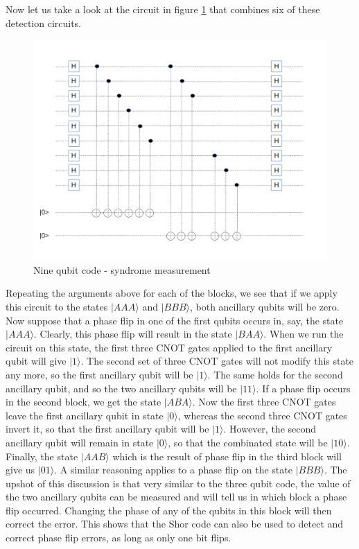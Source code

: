 \documentclass[a4paper, draft]{article}
\theoremstyle{own}
\theoremstyle{remark}
\begin{document}
Now let us take a look at the circuit in figure \ref{fig:NineQubitSyndromeMeasurement} that combines six of these detection circuits.

\begin{figure}[ht]
\centering
\includegraphics[width=1.0\linewidth]{images/NineQubitSyndromeMeasurement}
\caption[Nine qubit code - syndrome measurement]{Nine qubit code - syndrome measurement}
\label{fig:NineQubitSyndromeMeasurement}
\end{figure}

Repeating the arguments above for each of the blocks, we see that if we apply this circuit to the states $|AAA \rangle$ and $|BBB \rangle$, both ancillary qubits will be zero. Now suppose that a phase flip in one of the first qubits occurs in, say, the state $|AAA \rangle$. Clearly, this phase flip will result in the state $|BAA \rangle$. When we run the circuit on this state, the first three CNOT gates applied to the first ancillary qubit will give $|1 \rangle$. The second set of three CNOT gates will not modify this state any more, so the first ancillary qubit will be $|1 \rangle$. The same holds for the second ancillary qubit, and so the two ancillary qubits will be $|11 \rangle$. If a phase flip occurs in the second block, we get the state $|ABA \rangle$. Now the first three CNOT gates leave the first ancillary qubit in state $|0 \rangle$, whereas the second three CNOT gates invert it, so that the first ancillary qubit will be $|1 \rangle$. However, the second ancillary qubit will remain in state $|0 \rangle$, so that the combinated state will be $|10 \rangle$. Finally, the state $|AAB \rangle$ which is the result of phase flip in the third block will give us $|01 \rangle$. A similar reasoning applies to a phase flip on the state $|BBB \rangle$. The upshot of this discussion is that very similar to the three qubit code, the value of the two ancillary qubits can be measured and will tell us in which block a phase flip occurred. Changing the phase of any of the qubits in this block will then correct the error. This shows that the Shor code can also be used to detect and correct phase flip errors, as long as only one bit flips. 
\end{document}
